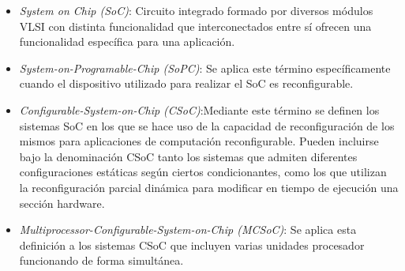  
\begin {itemize}
\item 
\textit{System on Chip (SoC)}:
 Circuito integrado formado por diversos módulos VLSI con distinta funcionalidad que interconectados entre sí ofrecen una funcionalidad específica para una aplicación. 
\item 
\textit{System-on-Programable-Chip (SoPC)}: Se aplica este término específicamente cuando el dispositivo utilizado para realizar el SoC es reconfigurable.
\item 
\textit{Configurable-System-on-Chip (CSoC)}:Mediante este término se definen los sistemas SoC en los que se hace uso de la capacidad de reconfiguración de los mismos para aplicaciones de computación reconfigurable. Pueden incluirse bajo la denominación CSoC tanto los sistemas que admiten diferentes configuraciones estáticas según ciertos condicionantes, como los que utilizan la reconfiguración parcial dinámica para modificar en tiempo de ejecución una sección hardware.
\item 
\textit{Multiprocessor-Configurable-System-on-Chip (MCSoC)}: Se aplica esta definición a los sistemas CSoC que incluyen varias unidades procesador funcionando de forma simultánea.
 \end {itemize}






